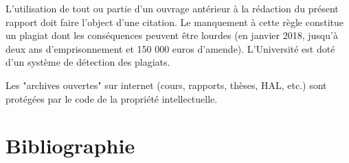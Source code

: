 \documentclass[a4paper,11pt]{paper}
\begin{document}
L'utilisation de tout ou partie d'un ouvrage antérieur à la rédaction du présent rapport doit faire l'object d'une citation. Le manquement à cette règle constitue un plagiat dont les conséquences peuvent être lourdes (en janvier 2018, jusqu’à deux ans d’emprisonnement et 150 000 euros d’amende). L'Université est doté d'un système de détection des plagiats.

Les "archives ouvertes" sur internet (cours, rapports, thèses, HAL, etc.) sont protégées par le code de la propriété intellectuelle. 


\newpage
\section{Bibliographie}
\nocite{*}


\newpage

\end{document}
